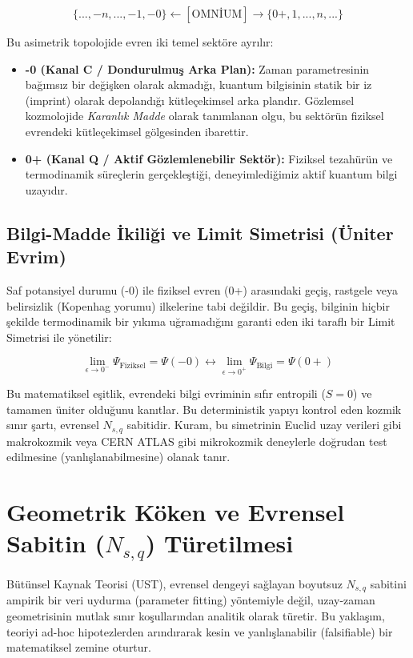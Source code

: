 \documentclass[12pt,a4paper]{article}
\begin{document}
\begin{equation}
\{..., -n, ..., -1, -0\} \longleftarrow[\text{OMNİUM}] \longrightarrow \{0+, 1, ..., n, ...\}
\end{equation}

Bu asimetrik topolojide evren iki temel sektöre ayrılır:
\begin{itemize}
    \item \textbf{-0 (Kanal C / Dondurulmuş Arka Plan):} Zaman parametresinin bağımsız bir değişken olarak akmadığı, kuantum bilgisinin statik bir iz (imprint) olarak depolandığı kütleçekimsel arka plandır. Gözlemsel kozmolojide \textit{Karanlık Madde} olarak tanımlanan olgu, bu sektörün fiziksel evrendeki kütleçekimsel gölgesinden ibarettir.
    \item \textbf{0+ (Kanal Q / Aktif Gözlemlenebilir Sektör):} Fiziksel tezahürün ve termodinamik süreçlerin gerçekleştiği, deneyimlediğimiz aktif kuantum bilgi uzayıdır.
\end{itemize}

\subsection{Bilgi-Madde İkiliği ve Limit Simetrisi (Üniter Evrim)}
Saf potansiyel durumu (-0) ile fiziksel evren (0+) arasındaki geçiş, rastgele veya belirsizlik (Kopenhag yorumu) ilkelerine tabi değildir. Bu geçiş, bilginin hiçbir şekilde termodinamik bir yıkıma uğramadığını garanti eden iki taraflı bir Limit Simetrisi ile yönetilir:

\begin{equation}
\lim_{\epsilon \to 0^{-}} \Psi_{\text{Fiziksel}} = \Psi(-0) \longleftrightarrow \lim_{\epsilon \to 0^{+}} \Psi_{\text{Bilgi}} = \Psi(0+)
\end{equation}

Bu matematiksel eşitlik, evrendeki bilgi evriminin sıfır entropili ($S=0$) ve tamamen üniter olduğunu kanıtlar. Bu deterministik yapıyı kontrol eden kozmik sınır şartı, evrensel $N_{s,q}$ sabitidir. Kuram, bu simetrinin Euclid uzay verileri gibi makrokozmik veya CERN ATLAS gibi mikrokozmik deneylerle doğrudan test edilmesine (yanlışlanabilmesine) olanak tanır.

\section{Geometrik Köken ve Evrensel Sabitin ($N_{s,q}$) Türetilmesi}

Bütünsel Kaynak Teorisi (UST), evrensel dengeyi sağlayan boyutsuz $N_{s,q}$ sabitini ampirik bir veri uydurma (parameter fitting) yöntemiyle değil, uzay-zaman geometrisinin mutlak sınır koşullarından analitik olarak türetir. Bu yaklaşım, teoriyi ad-hoc hipotezlerden arındırarak kesin ve yanlışlanabilir (falsifiable) bir matematiksel zemine oturtur.
\end{document}
